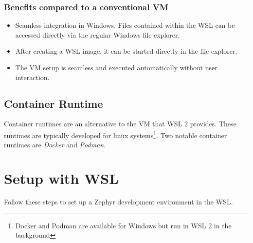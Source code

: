 \subsubsection*{Benefits compared to a conventional VM}

\begin{itemize}
  \item Seamless integration in Windows.
    Files contained within the WSL can be accessed directly via the regular Windows file explorer.
  \item After creating a WSL image, it can be started directly in the file explorer.
  \item The VM setup is seamless and executed automatically without user
    interaction.
\end{itemize}

\subsection{Container Runtime}
Container runtimes are an alternative to the VM that WSL 2 provides.
These runtimes are typically developed for linux systems\footnote{Docker and Podman are available for Windows but run in WSL 2 in the background}.
Two notable container runtimes are \emph{Docker} and \emph{Podman}.

\newpage

\section{Setup with WSL}

Follow these steps to set up a Zephyr development environment in the WSL.

